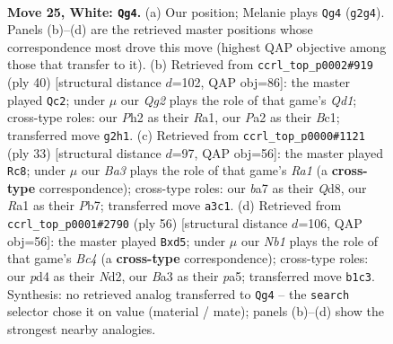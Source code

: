 \documentclass[11pt]{article}
\begin{document}
\clearpage

\begin{figure}[p]\centering
\begin{subfigure}{0.46\textwidth}\centering
\resizebox{\linewidth}{!}{%
\newchessgame
\chessboard[
  setfen={r3r1k1/bp1b1pp1/pq2p3/7P/3p1n2/BP5B/P2P1PQP/RN2RK2 w - - 1 25},
  showmover=false,
  pgfstyle=straightmove, color=movearrow, markmove={g2-g4}
]}
\caption{}
\end{subfigure}\hfill
\begin{subfigure}{0.46\textwidth}\centering
\resizebox{\linewidth}{!}{%
\newchessgame
\chessboard[
  setfen={r2qrbk1/1b4p1/p2p3p/4pp2/1p6/PPn2NNP/B4PP1/R1BQR1K1 w - - 2 21},
  showmover=false,
  pgfstyle=straightmove, color=movearrow, markmove={d1-c2}
]}
\caption{}
\end{subfigure}
\\[4pt]
\begin{subfigure}{0.46\textwidth}\centering
\resizebox{\linewidth}{!}{%
\newchessgame
\chessboard[
  setfen={r2qr1k1/1ppb1pbp/3p2p1/pNnP4/4P3/4BP2/PP1QB1PP/R4R1K b - - 2 17},
  showmover=false,
  pgfstyle=straightmove, color=movearrow, markmove={a8-c8}
]}
\caption{}
\end{subfigure}\hfill
\begin{subfigure}{0.46\textwidth}\centering
\resizebox{\linewidth}{!}{%
\newchessgame
\chessboard[
  setfen={r3qrk1/1R3pbp/3Pb1p1/p2n4/2B1pB2/4Q2P/3N1PP1/3R2K1 w - - 2 29},
  showmover=false,
  pgfstyle=straightmove, color=movearrow, markmove={c4-d5}
]}
\caption{}
\end{subfigure}
\caption{\textbf{Move 25, White: \texttt{Qg4}.} (a) Our position; Melanie plays \texttt{Qg4} (\texttt{g2g4}). Panels (b)--(d) are the retrieved master positions whose correspondence most drove this move (highest QAP objective among those that transfer to it). (b) Retrieved from \texttt{ccrl\_top\_p0002\#919} (ply 40) [structural distance $d$=102, QAP obj=86]: the master played \texttt{Qc2}; under $\mu$ our \emph{Qg2} plays the role of that game's \emph{Qd1}; cross-type roles: our \emph{P}h2 as their \emph{R}a1, our \emph{P}a2 as their \emph{B}c1; transferred move \texttt{g2h1}. (c) Retrieved from \texttt{ccrl\_top\_p0000\#1121} (ply 33) [structural distance $d$=97, QAP obj=56]: the master played \texttt{Rc8}; under $\mu$ our \emph{Ba3} plays the role of that game's \emph{Ra1} (a \textbf{cross-type} correspondence); cross-type roles: our \emph{b}a7 as their \emph{Q}d8, our \emph{R}a1 as their \emph{P}b7; transferred move \texttt{a3c1}. (d) Retrieved from \texttt{ccrl\_top\_p0001\#2790} (ply 56) [structural distance $d$=106, QAP obj=56]: the master played \texttt{Bxd5}; under $\mu$ our \emph{Nb1} plays the role of that game's \emph{Bc4} (a \textbf{cross-type} correspondence); cross-type roles: our \emph{p}d4 as their \emph{N}d2, our \emph{B}a3 as their \emph{p}a5; transferred move \texttt{b1c3}. Synthesis: no retrieved analog transferred to \texttt{Qg4} -- the \texttt{search} selector chose it on value (material / mate); panels (b)--(d) show the strongest nearby analogies.}
\label{fig:thought-m48}
\end{figure}
\end{document}
